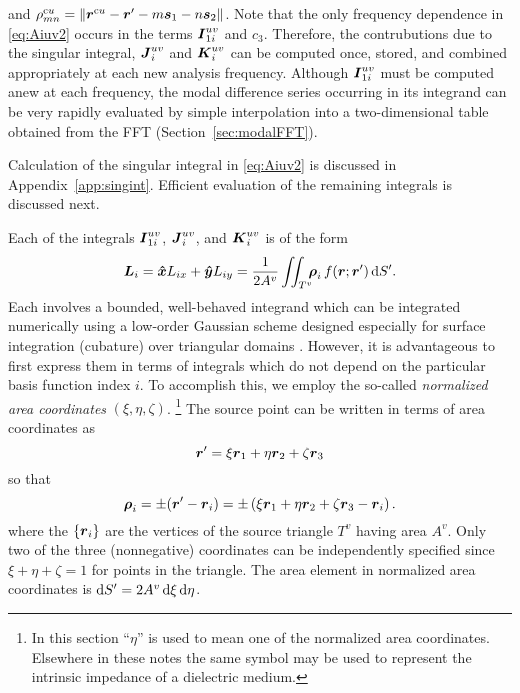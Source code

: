  and $\rho^{\text{c}u}_{mn} = \left\lVert\boldsymbol{r}^{\text{c}u}  - \boldsymbol{r}' - m\boldsymbol{s}_1 -n\boldsymbol{s}_2\right\rVert$.  Note that the
 only frequency dependence in \eqref{eq:Aiuv2} occurs in the terms
 $\boldsymbol{I}_{1i}^{uv}$ and $c_3$.  Therefore, the contrubutions due to the
 singular integral, $\boldsymbol{J}_i^{uv}$ and $\boldsymbol{K}_i^{uv}$ can be computed once,
stored, and combined appropriately at each new analysis frequency.
Although $\boldsymbol{I}_{1i}^{uv}$ must be computed anew at each frequency, the modal
difference series occurring in its integrand can be very rapidly evaluated by
simple interpolation into a two-dimensional table obtained from the
FFT (Section~\ref{sec:modalFFT}).

Calculation of the singular integral in \eqref{eq:Aiuv2} is discussed
in Appendix~\ref{app:singint}.  Efficient evaluation of the remaining
integrals is discussed next.

Each of the integrals $\boldsymbol{I}_{1i}^{uv}$, $\boldsymbol{J}_i^{uv}$, 
and $\boldsymbol{K}_i^{uv}$ is of
the form
\begin{equation}
  \boldsymbol{L}_i = \boldsymbol{\hat{x}} L_{ix} + \boldsymbol{\hat{y}} L_{iy} = \frac{1}{2A^v} \iint_{T^v} \!\!\!
  \boldsymbol{\rho}_i \,
  f(\boldsymbol{r};\boldsymbol{r}') \, \text{d} S'.
\end{equation}
Each involves a bounded, well-behaved
integrand which can be integrated numerically using a low-order Gaussian 
scheme designed especially for surface integration (cubature)
over triangular domains \cite{zien:71}.  However, it is advantageous to first 
express them in terms of integrals which do not depend on the particular basis function
index $i$.  To accomplish 
this, we employ the so-called {\em normalized area coordinates\/} 
$(\xi,\eta,\zeta)$.%
\footnote{In this section ``$\eta$'' is used to mean one of the 
  normalized area coordinates.  Elsewhere in these notes the same symbol 
  may be used to represent the intrinsic impedance of a dielectric medium.}
The source point can be written in terms of area coordinates as
\begin{equation}
  \boldsymbol{r}' = \xi \boldsymbol{r}_1 + \eta \boldsymbol{r}_2 + \zeta \boldsymbol{r}_3
\end{equation}
so that
\begin{equation}
  \boldsymbol{\rho}_i = \pm(\boldsymbol{r}' - \boldsymbol{r}_i) = \pm \left(
    \xi \boldsymbol{r}_1 + \eta \boldsymbol{r}_2 + \zeta \boldsymbol{r}_3 - \boldsymbol{r}_i
  \right).
\end{equation}
where the $\{ \boldsymbol{r}_i \}$ are the vertices of the source triangle $T^v$ having
area $A^v$. Only two of the three (nonnegative)  
coordinates can be independently specified since $\xi + \eta + \zeta = 1$ for 
points in the triangle. 
The area element in normalized area coordinates is $\text{d} S' = 2 A^v \,\text{d}\xi\,\text{d}\eta$.

